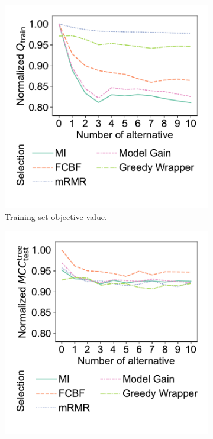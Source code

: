 \documentclass{article}
\theoremstyle{definition}
\begin{document}
\begin{figure}[htb]
	\centering
	\begin{subfigure}[t]{0.48\textwidth}
		\centering
		\includegraphics[width=\textwidth, trim=20 40 15 15, clip]{plots/afs-impact-num-alternatives-fs-method-train-objective-max.pdf}
		\caption{Training-set objective value.}
		\label{fig:afs:impact-num-alternatives-fs-method-train-objective-max}
	\end{subfigure}
	\hfill
	\begin{subfigure}[t]{0.48\textwidth}
		\centering
		\includegraphics[width=\textwidth, trim=20 40 15 15, clip]{plots/afs-impact-num-alternatives-fs-method-decision-tree-test-mcc-max.pdf}

\end{subfigure}
\end{figure}
\end{document}
